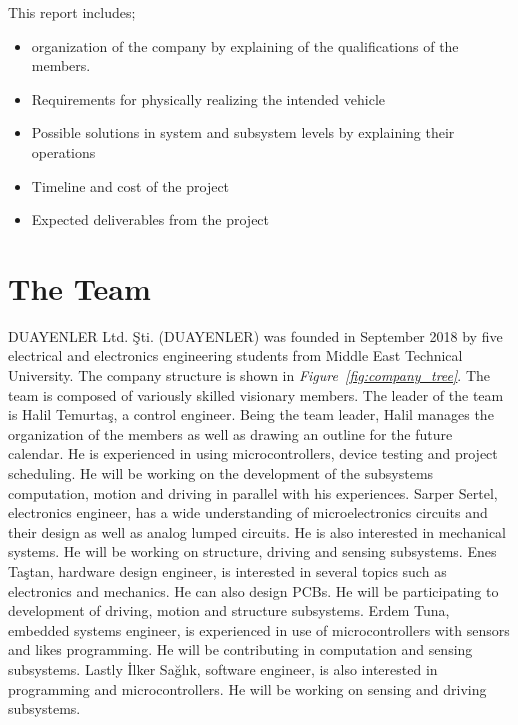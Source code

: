 \documentclass[a4paper,12pt]{article}
\begin{document}
This report includes;
\begin{itemize}
	\item organization of the company by explaining of the qualifications of the members. 
	\item Requirements for physically realizing the intended vehicle
	\item Possible solutions in system and subsystem levels by explaining their operations
	\item Timeline and cost of the project
	\item Expected deliverables from the project 
\end{itemize} 



\section{The Team}

	DUAYENLER Ltd. Şti. (DUAYENLER) was founded in September 2018 by five electrical and electronics engineering students from Middle East Technical University. The company structure is shown in \textit{Figure~\ref{fig:company_tree}}. The team is composed of variously skilled visionary members. The leader of the team is Halil Temurtaş, a control engineer. Being the team leader, Halil manages the organization of the members as well as drawing an outline for the future calendar. He is experienced in using microcontrollers, device testing and project scheduling. He will be working on the development of the subsystems computation, motion and driving in parallel with his experiences. Sarper Sertel, electronics engineer, has a wide understanding of microelectronics circuits and their design as well as analog lumped circuits. He is also interested in mechanical systems. He will be working on structure, driving and sensing subsystems. Enes Taştan, hardware design engineer, is interested in several topics such as electronics and mechanics. He can also design PCBs. He will be participating to development of driving, motion and structure subsystems. Erdem Tuna, embedded systems engineer, is experienced in use of microcontrollers with sensors and likes programming. He will be contributing in computation and sensing subsystems. Lastly İlker Sağlık, software engineer, is also interested in programming and microcontrollers. He will be working on sensing and driving subsystems.
\end{document}
